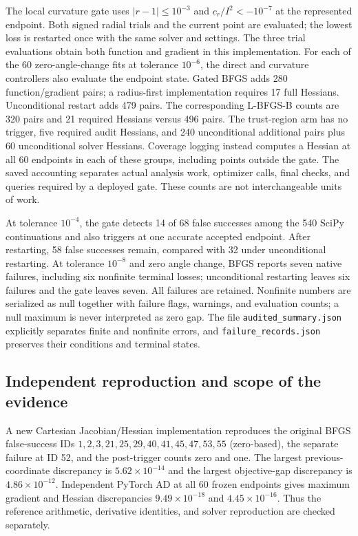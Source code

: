 The local curvature gate uses $|r-1|\leq10^{-3}$ and $c_r/I^2<-10^{-7}$ at the represented endpoint. Both signed radial trials and the current point are evaluated; the lowest loss is restarted once with the same solver and settings. The three trial evaluations obtain both function and gradient in this implementation. For each of the 60 zero-angle-change fits at tolerance $10^{-6}$, the direct and curvature controllers also evaluate the endpoint state. Gated BFGS adds 280 function/gradient pairs; a radius-first implementation requires 17 full Hessians. Unconditional restart adds 479 pairs. The corresponding L-BFGS-B counts are 320 pairs and 21 required Hessians versus 496 pairs. The trust-region arm has no trigger, five required audit Hessians, and 240 unconditional additional pairs plus 60 unconditional solver Hessians. Coverage logging instead computes a Hessian at all 60 endpoints in each of these groups, including points outside the gate. The saved accounting separates actual analysis work, optimizer calls, final checks, and queries required by a deployed gate. These counts are not interchangeable units of work.

At tolerance $10^{-4}$, the gate detects 14 of 68 false successes among the 540 SciPy continuations and also triggers at one accurate accepted endpoint. After restarting, 58 false successes remain, compared with 32 under unconditional restarting. At tolerance $10^{-8}$ and zero angle change, BFGS reports seven native failures, including six nonfinite terminal losses; unconditional restarting leaves six failures and the gate leaves seven. All failures are retained. Nonfinite numbers are serialized as null together with failure flags, warnings, and evaluation counts; a null maximum is never interpreted as zero gap. The file \nolinkurl{audited_summary.json} explicitly separates finite and nonfinite errors, and \nolinkurl{failure_records.json} preserves their conditions and terminal states.

\subsection{Independent reproduction and scope of the evidence}
A new Cartesian Jacobian/Hessian implementation reproduces the original BFGS false-success IDs $1,2,3,21,25,29,40,41,45,47,53,55$ (zero-based), the separate failure at ID 52, and the post-trigger counts zero and one. The largest previous-coordinate discrepancy is $5.62\times10^{-14}$ and the largest objective-gap discrepancy is $4.86\times10^{-12}$. Independent PyTorch AD at all 60 frozen endpoints gives maximum gradient and Hessian discrepancies $9.49\times10^{-18}$ and $4.45\times10^{-16}$. Thus the reference arithmetic, derivative identities, and solver reproduction are checked separately.

